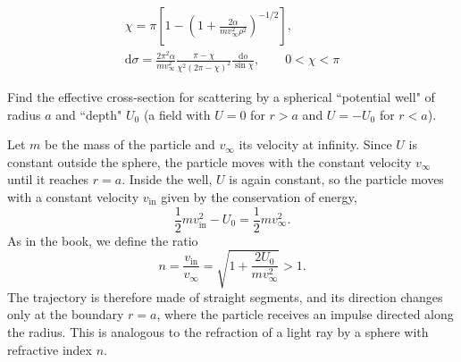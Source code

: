 \begin{problem}[title={Scattering in a repulsive \texorplain{$\alpha/r^2$}{α/r²} field}]
{}
{
\begin{gather*}
    \chi = \pi\left[ 1 - \left( 1 + \frac{2\alpha}{mv_\infty^2\rho^2} \right)^{-1/2} \right], \\
    \mathrm{d}\sigma = \frac{2\pi^2\alpha}{mv_\infty^2}\frac{\pi - \chi}{\chi^2(2\pi - \chi)^2}\frac{\mathrm{d}o}{\sin{\chi}}, \qquad 0 < \chi < \pi
\end{gather*}
}
\end{problem}


\begin{problem}[title={Scattering by a spherical potential well}]
{
Find the effective cross-section for scattering by a spherical ``potential well" of radius $a$ and ``depth" $U_0$ (\ie a field with $U = 0$ for $r > a$ and $U = -U_0$ for $r < a$).
}
{
Let $m$ be the mass of the particle and $v_\infty$ its velocity at infinity. Since $U$ is constant outside the sphere, the particle moves with the constant velocity $v_\infty$ until it reaches $r = a$. Inside the well, $U$ is again constant, so the particle moves with a constant velocity $v_{\mathrm{in}}$ given by the conservation of energy,
\begin{equation*}
    \frac{1}{2}mv_{\mathrm{in}}^2 - U_0 = \frac{1}{2}mv_\infty^2.
\end{equation*}
As in the book, we define the ratio
\begin{equation*}
    n = \frac{v_{\mathrm{in}}}{v_\infty} = \sqrt{1 + \frac{2U_0}{mv_\infty^2}} > 1.
\end{equation*}
The trajectory is therefore made of straight segments, and its direction changes only at the boundary $r = a$, where the particle receives an impulse directed along the radius. This is analogous to the refraction of a light ray by a sphere with refractive index $n$.

}
\end{problem}
